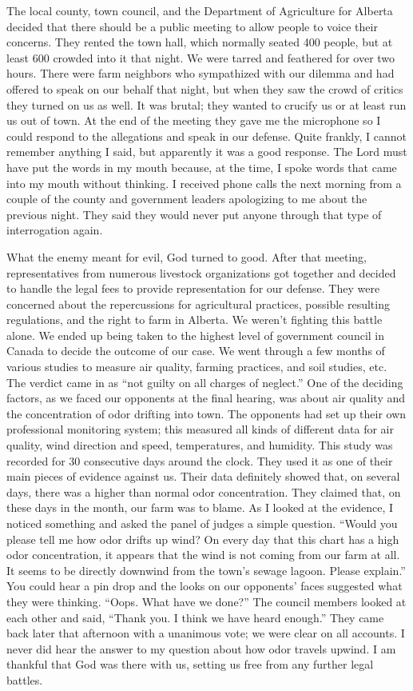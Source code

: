 \documentclass[oneside]{book}
\begin{document}
The local county, town council, and the Department of Agriculture for Alberta decided that there should be a public meeting to allow people to voice their concerns. They rented the town hall, which normally seated 400 people, but at least 600 crowded into it that night. We were tarred and feathered for over two hours. There were farm neighbors who sympathized with our dilemma and had offered to speak on our behalf that night, but when they saw the crowd of critics they turned on us as well. It was brutal; they wanted to crucify us or at least run us out of town. At the end of the meeting they gave me the microphone so I could respond to the allegations and speak in our defense. Quite frankly, I cannot remember anything I said, but apparently it was a good response. The Lord must have put the words in my mouth because, at the time, I spoke words that came into my mouth without thinking. I received phone calls the next morning from a couple of the county and government leaders apologizing to me about the previous night. They said they would never put anyone through that type of interrogation again. 

What the enemy meant for evil, God turned to good. After that meeting, representatives from numerous livestock organizations got together and decided to handle the legal fees to provide representation for our defense. They were concerned about the repercussions for agricultural practices, possible resulting regulations, and the right to farm in Alberta. We weren’t fighting this battle alone. We ended up being taken to the highest level of government council in Canada to decide the outcome of our case. We went through a few months of various studies to measure air quality, farming practices, and soil studies, etc. The verdict came in as “not guilty on all charges of neglect.” One of the deciding factors, as we faced our opponents at the final hearing, was about air quality and the concentration of odor drifting into town. The opponents had set up their own professional monitoring system; this measured all kinds of different data for air quality, wind direction and speed, temperatures, and humidity. This study was recorded for 30 consecutive days around the clock. They used it as one of their main pieces of evidence against us. Their data definitely showed that, on several days, there was a higher than normal odor concentration. They claimed that, on these days in the month, our farm was to blame. As I looked at the evidence, I noticed something and asked the panel of judges a simple question. “Would you please tell me how odor drifts up wind? On every day that this chart has a high odor concentration, it appears that the wind is not coming from our farm at all. It seems to be directly downwind from the town's sewage lagoon. Please explain.” You could hear a pin drop and the looks on our opponents’ faces suggested what they were thinking. “Oops. What have we done?” The council members looked at each other and said, “Thank you. I think we have heard enough.” They came back later that afternoon with a unanimous vote; we were clear on all accounts. I never did hear the answer to my question about how odor travels upwind. I am thankful that God was there with us, setting us free from any further legal battles. 
\end{document}
